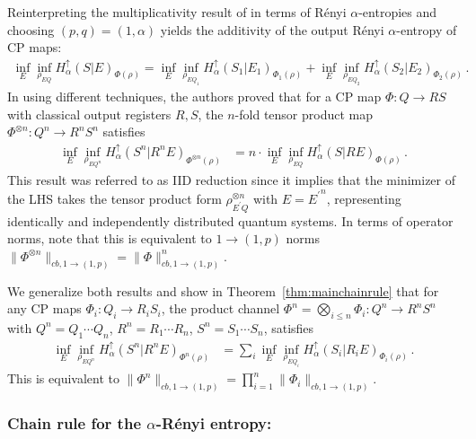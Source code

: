 \documentclass[11pt]{article}
\newcommand{\1}{\ensuremath{\mathbbm{1}}}
\theoremstyle{newdefinition}
\theoremstyle{newplain}
\theoremstyle{myplain}
\begin{document}
Reinterpreting the multiplicativity result of \cite{Devetak.2006} in terms of Rényi $\alpha$-entropies and choosing $(p,q) = (1,\alpha)$ yields the additivity of the output Rényi $\alpha$-entropy of CP maps:
\begin{align}
\inf_E\inf_{\rho_{EQ}}H_\alpha^\uparrow(S|E)_{\Phi(\rho)}=\inf_E\inf_{\rho_{EQ_1}}H_\alpha^\uparrow(S_1|E_1)_{\Phi_1(\rho)}+\inf_E\inf_{\rho_{EQ_2}}H_\alpha^\uparrow(S_2|E_2)_{\Phi_2(\rho)}\,.
\end{align}
In \cite{Himbeeck.2025} using different techniques, the authors proved that for a CP map $\Phi:Q\to RS$ with classical output registers $R,S$, the $n$-fold tensor product map $\Phi^{\otimes n} : Q^n\to R^nS^n$ satisfies
\begin{align}
\inf_E\inf_{\rho_{EQ^n}}H_\alpha^\uparrow(S^n|R^nE)_{\Phi^{\otimes n}(\rho)}
        &= n \cdot \inf_E\inf_{\rho_{EQ}}H_\alpha^\uparrow(S|RE)_{\Phi(\rho)}\,.
\end{align}
This result was referred to as IID reduction since it implies that the minimizer of the LHS takes the tensor product form $\rho_{E^\prime Q}^{\otimes n}$ with $E = {E^\prime}^n$, representing identically and independently distributed quantum systems. In terms of operator norms, note that this is equivalent to $1\to (1,p)$ norms $\|\Phi^{\otimes n}\|_{cb, 1 \to (1,p)} = \|\Phi\|_{cb, 1 \to (1,p)}^n$.

We generalize both results and show in Theorem~\ref{thm:mainchainrule} that for any CP maps $\Phi_i:Q_i\to R_iS_i$, the product channel $\Phi^n=\bigotimes_{i\le n} \Phi_i :Q^n\to R^n S^n$ with $Q^n = Q_1\cdots Q_n$, $R^n = R_1\cdots R_n$, $S^n=S_1 \cdots S_n$, satisfies 
\begin{align}\label{eq:generalized.IID.intro}
\inf_E\inf_{\rho_{EQ^n}}H_\alpha^\uparrow(S^n|R^nE)_{\Phi^n(\rho)}
        &= \sum_i \inf_E\inf_{\rho_{EQ_i}}H_\alpha^\uparrow(S_i|R_iE)_{\Phi_i(\rho)}\,.
\end{align}
This is equivalent to $\|\Phi^n\|_{cb, 1 \to (1,p)} = \prod_{i=1}^n \|\Phi_i\|_{cb, 1 \to (1,p)}$.


\subsubsection{Chain rule for the $\alpha$-Rényi entropy:}
\end{document}
